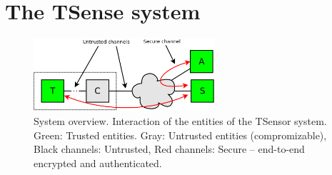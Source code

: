 \section{The TSense system}
\label{sec:tsense-system-overview}

\begin{figure}
\begin{center}
\includegraphics[width=0.6\textwidth]{figures/sys-overview.png} 
\end{center}
\caption{System overview. Interaction of the entities of the TSensor system. Green: Trusted entities. Gray: Untrusted entities (compromizable), Black channels: Untrusted, Red channels: Secure -- end-to-end encrypted and authenticated.}
\label{fig:sys-overview}
\end{figure}

